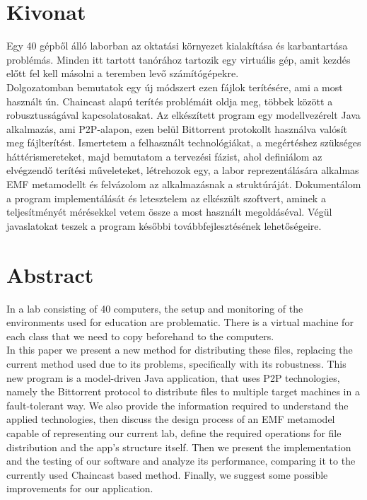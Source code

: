 \setcounter{page}{1}

\selecthungarian

\chapter*{Kivonat}

Egy 40 gépből álló laborban az oktatási környezet kialakítása és karbantartása problémás. Minden itt tartott tanórához tartozik egy virtuális gép, amit kezdés előtt fel kell másolni a teremben levő számítógépekre.\\
Dolgozatomban bemutatok egy új módszert ezen fájlok terítésére, ami a most használt ún. Chaincast alapú terítés problémáit oldja meg, többek között a robusztusságával kapcsolatosakat. Az elkészített program egy modellvezérelt Java alkalmazás, ami P2P-alapon, ezen belül Bittorrent protokollt használva valósít meg fájlterítést. Ismertetem a felhasznált technológiákat, a megértéshez szükséges háttérismereteket, majd bemutatom a tervezési fázist, ahol definiálom az elvégzendő terítési műveleteket, létrehozok egy, a labor reprezentálására alkalmas EMF metamodellt és felvázolom az alkalmazásnak a struktúráját. Dokumentálom a program implementálását és letesztelem az elkészült szoftvert, aminek a teljesítményét mérésekkel vetem össze a most használt megoldáséval. Végül javaslatokat teszek a program későbbi továbbfejlesztésének lehetőségeire.
\vfill
\selectenglish
\chapter*{Abstract}

In a lab consisting of 40 computers, the setup and monitoring of the environments used for education are problematic. There is a virtual machine for each class that we need to copy beforehand to the computers.\\
In this paper we present a new method for distributing these files, replacing the current method used due to its problems, specifically with its robustness. This new program is a model-driven Java application, that uses P2P technologies, namely the Bittorrent protocol to distribute files to multiple target machines in a fault-tolerant way. We also provide the information required to understand the applied technologies, then discuss the design process of an EMF metamodel capable of representing our current lab, define the required operations for file distribution and the app's structure itself. Then we present the implementation and the testing of our software and analyze its performance, comparing it to the currently used Chaincast based method. Finally, we suggest some possible improvements for our application.
\vfill
\selectthesislanguage

\setcounter{romanPage}{\value{page}}
